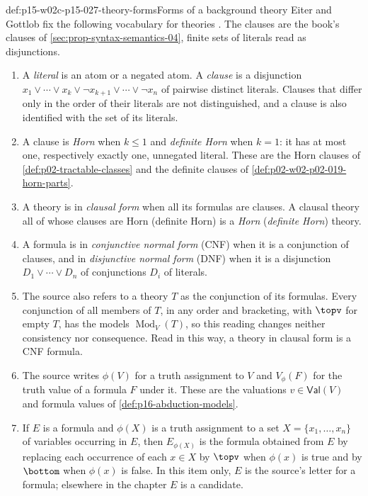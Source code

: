 \begin{hbdefinition}{def:p15-w02c-p15-027-theory-forms}{Forms of a background theory}
Eiter and Gottlob fix the following vocabulary for theories
\cite[manuscript p.~9]{EiterGottlobAbductionManuscript}. The clauses are
the book's clauses of \cref{sec:prop-syntax-semantics-04}, finite sets of
literals read as disjunctions.
\begin{enumerate}
\item A \emph{literal} is an atom or a negated atom. A \emph{clause} is a
      disjunction
      \(x_1\lor\cdots\lor x_k\lor\neg x_{k+1}\lor\cdots\lor\neg x_n\)
      of pairwise distinct literals. Clauses that differ only in the
      order of their literals are not distinguished, and a clause is also
      identified with the set of its literals.
\item A clause is \emph{Horn} when \(k\le 1\) and \emph{definite Horn}
      when \(k=1\): it has at most one, respectively exactly one,
      unnegated literal. These are the Horn clauses of
      \cref{def:p02-tractable-classes} and the definite clauses of
      \cref{def:p02-w02-p02-019-horn-parts}.
\item A theory is in \emph{clausal form} when all its formulas are
      clauses. A clausal theory all of whose clauses are Horn (definite
      Horn) is a \emph{Horn} (\emph{definite Horn}) theory.
\item A formula is in \emph{conjunctive normal form} (CNF) when it is a
      conjunction of clauses, and in \emph{disjunctive normal form} (DNF)
      when it is a disjunction \(D_1\lor\cdots\lor D_n\) of conjunctions
      \(D_i\) of literals.
\item The source also refers to a theory \(T\) as the conjunction of its
      formulas. Every conjunction of all members of \(T\), in any order and
      bracketing, with \(\topv\) for empty \(T\), has the models
      \(\operatorname{Mod}_V(T)\), so this reading changes neither
      consistency nor consequence. Read in this way, a theory in clausal
      form is a CNF formula.
\item The source writes \(\phi(V)\) for a truth assignment to \(V\) and
      \(V_\phi(F)\) for the truth value of a formula \(F\) under it. These
      are the valuations \(v\in\mathsf{Val}(V)\) and formula values of
      \cref{def:p16-abduction-models}.
\item If \(E\) is a formula and \(\phi(X)\) is a truth assignment to a set
      \(X=\{x_1,\ldots,x_n\}\) of variables occurring in \(E\), then
      \(E_{\phi(X)}\) is the formula obtained from \(E\) by replacing each
      occurrence of each \(x\in X\) by \(\topv\) when \(\phi(x)\) is true
      and by \(\bottom\) when \(\phi(x)\) is false. In this item only,
      \(E\) is the source's letter for a formula; elsewhere in the chapter
      \(E\) is a candidate.
\end{enumerate}
\end{hbdefinition}

